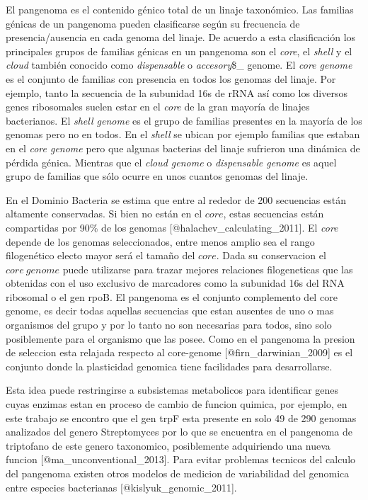 \documentclass[]{article}
\begin{document}
El pangenoma es el contenido génico total de un linaje taxonómico. Las
familias génicas de un pangenoma pueden clasificarse según su frecuencia
de presencia/ausencia en cada genoma del linaje. De acuerdo a esta
clasificación los principales grupos de familias génicas en un pangenoma
son el \emph{core}, el \emph{shell} y el \emph{cloud} también conocido
como \emph{dispensable} o \emph{accesory}\$\_ genome. El \emph{core
genome} es el conjunto de familias con presencia en todos los genomas
del linaje. Por ejemplo, tanto la secuencia de la subunidad 16s de rRNA
así como los diversos genes ribosomales suelen estar en el \emph{core}
de la gran mayoría de linajes bacterianos. El \emph{shell genome} es el
grupo de familias presentes en la mayoría de los genomas pero no en
todos. En el \emph{shell} se ubican por ejemplo familias que estaban en
el \emph{core genome} pero que algunas bacterias del linaje sufrieron
una dinámica de pérdida génica. Mientras que el \emph{cloud genome} o
\emph{dispensable genome} es aquel grupo de familias que sólo ocurre en
unos cuantos genomas del linaje.

En el Dominio Bacteria se estima que entre al rededor de 200 secuencias
están altamente conservadas. Si bien no están en el \(core\), estas
secuencias están compartidas por 90\% de los genomas
{[}@halachev\_calculating\_2011{]}. El \emph{core} depende de los
genomas seleccionados, entre menos amplio sea el rango filogenético
electo mayor será el tamaño del \(core\). Dada su conservacion el
\(core~genome\) puede utilizarse para trazar mejores relaciones
filogeneticas que las obtenidas con el uso exclusivo de marcadores como
la subunidad 16s del RNA ribosomal o el gen rpoB. El pangenoma es el
conjunto complemento del core genome, es decir todas aquellas secuencias
que estan ausentes de uno o mas organismos del grupo y por lo tanto no
son necesarias para todos, sino solo posiblemente para el organismo que
las posee. Como en el pangenoma la presion de seleccion esta relajada
respecto al core-genome {[}@firn\_darwinian\_2009{]} es el conjunto
donde la plasticidad genomica tiene facilidades para desarrollarse.

Esta idea puede restringirse a subsistemas metabolicos para identificar
genes cuyas enzimas estan en proceso de cambio de funcion quimica, por
ejemplo, en este trabajo se encontro que el gen trpF esta presente en
solo 49 de 290 genomas analizados del genero Streptomyces por lo que se
encuentra en el pangenoma de triptofano de este genero taxonomico,
posiblemente adquiriendo una nueva funcion
{[}@ma\_unconventional\_2013{]}. Para evitar problemas tecnicos del
calculo del pangenoma existen otros modelos de medicion de variabilidad
del genomica entre especies bacterianas {[}@kislyuk\_genomic\_2011{]}.
\end{document}
